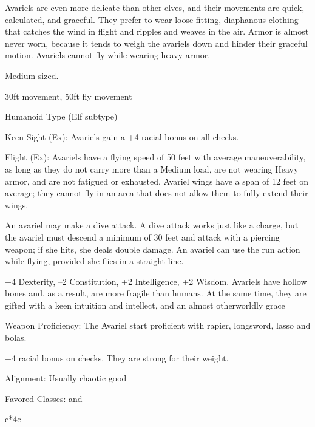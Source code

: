 Avariels are even more delicate than other elves, and their movements are quick, calculated, and graceful. They prefer to wear loose fitting, diaphanous clothing that catches the wind in flight and ripples and weaves in the air. Armor is almost never worn, because it tends to weigh the avariels down and hinder their graceful motion. Avariels cannot fly while wearing heavy armor.
\begin{multicols}{2}

\begin{itemize*}
\item Medium sized.
\item 30ft movement, 50ft fly movement
\item Humanoid Type (Elf subtype)
\item Keen Sight (Ex): Avariels gain a +4 racial bonus on all  checks.
\item Flight (Ex): Avariels have a flying speed of 50 feet with average maneuverability, as long as they do not carry more than a Medium load, are not wearing Heavy armor, and are not fatigued or exhausted. Avariel wings have a span of 12 feet on average; they cannot fly in an area that does not allow them to fully extend their wings.

An avariel may make a dive attack. A dive attack works just like a charge, but the avariel must descend a minimum of 30 feet and attack with a piercing weapon; if she hits, she deals double damage. An avariel can use the run action while flying, provided she flies in a straight line.
\item +4 Dexterity, –2 Constitution, +2 Intelligence, +2 Wisdom. Avariels have hollow bones and, as a result, are more fragile than humans. At the same time, they are gifted with a keen intuition and intellect, and an almost otherworldly grace
\item Weapon Proficiency: The Avariel start proficient with rapier, longsword, lasso and bolas.
\item +4 racial bonus on  checks. They are strong for their weight.
\item Alignment: Usually chaotic good
\item Favored Classes:  and 
\end{itemize*}

\begin{multicolsbasictable}{c*{4}{c}}


\end{multicolsbasictable}
\end{multicols}
